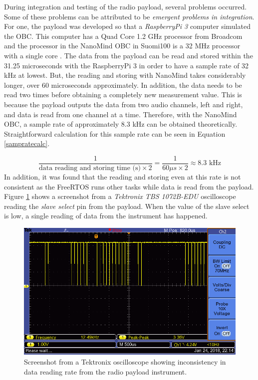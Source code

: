 \documentclass[english,12pt,a4paper,pdftex,elec,utf8]{aaltothesis}
\begin{document}
During integration and testing of the radio payload, several problems occurred. Some of these problems can be attributed to be \textit{emergent problems in integration}. For one, the payload was developed so that a \textit{RaspberryPi 3} computer simulated the OBC. This computer has a Quad Core 1.2 GHz processor from Broadcom \cite{raspi3} and the processor in the NanoMind OBC in Suomi100 is a 32 MHz processor with a single core \cite{nanomindds}. The data from the payload can be read and stored within the 31.25 microseconds with the RaspberryPi 3 in order to have a sample rate of 32 kHz at lowest. But, the reading and storing with NanoMind takes considerably longer, over 60 microseconds approximately. In addition, the data needs to be read two times before obtaining a completely new measurement value. This is because the payload outputs the data from two audio channels, left and right, and data is read from one channel at a time. Therefore, with the NanoMind OBC, a sample rate of approximately 8.3 kHz can be obtained theoretically. Straightforward calculation for this sample rate can be seen in Equation \ref{sampratecalc}. \par
\begin{equation}
\frac{1}{\textrm{data reading and storing time (s)}\times2} = \frac{1}{60 \mu s\times2} \approx 8.3 \textrm{ kHz}
\label{sampratecalc}
\end{equation}
In addition, it was found that the reading and storing even at this rate is not consistent as the FreeRTOS runs other tasks while data is read from the payload. Figure \ref{payloadosc1} shows a screenshot from a \textit{Tektronix TBS 1072B-EDU} oscilloscope reading the \textit{slave select} pin from the payload. When the value of the slave select is low, a single reading of data from the instrument has happened.
\begin{figure}[h!]
\centering
\includegraphics[scale=0.5]{F0001TEK}
\caption{Screenshot from a Tektronix oscilloscope showing inconsistency in data reading rate from the radio payload instrument.}
\label{payloadosc1}
\end{figure}
\end{document}
